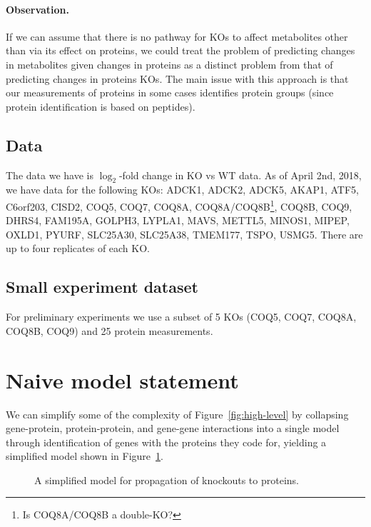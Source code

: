 \documentclass{article}
\begin{document}
\paragraph{Observation.}
If we can assume that there is no pathway for KOs to affect metabolites other than via its effect on proteins, we could treat the problem of predicting changes in metabolites given changes in proteins as a distinct problem from that of predicting changes in proteins KOs.
The main issue with this approach is that our measurements of proteins in some cases identifies protein groups (since protein identification is based on peptides).

\subsection{Data}

The data we have is $\log_2$-fold change in KO vs WT data.
As of April 2nd, 2018, we have data for the following KOs:
ADCK1, ADCK2, ADCK5, AKAP1, ATF5, C6orf203, CISD2, COQ5, COQ7, COQ8A, COQ8A/COQ8B\footnote{Is COQ8A/COQ8B a double-KO?}, COQ8B, COQ9, DHRS4, FAM195A, GOLPH3, LYPLA1, MAVS, METTL5, MINOS1, MIPEP, OXLD1, PYURF, SLC25A30, SLC25A38, TMEM177, TSPO, USMG5.
There are up to four replicates of each KO.

\subsection{Small experiment dataset}

For preliminary experiments we use a subset of 5 KOs (COQ5, COQ7, COQ8A, COQ8B, COQ9) and 25 protein measurements.

\section{Naive model statement}

We can simplify some of the complexity of Figure~\ref{fig:high-level} by collapsing gene-protein, protein-protein, and gene-gene interactions into a single model through identification of genes with the proteins they code for, yielding a simplified model shown in Figure~\ref{fig:simplified-proteins}.

\begin{figure}
\centering
{}
\caption{A simplified model for propagation of knockouts to proteins.}
\label{fig:simplified-proteins}
\end{figure}
\end{document}
